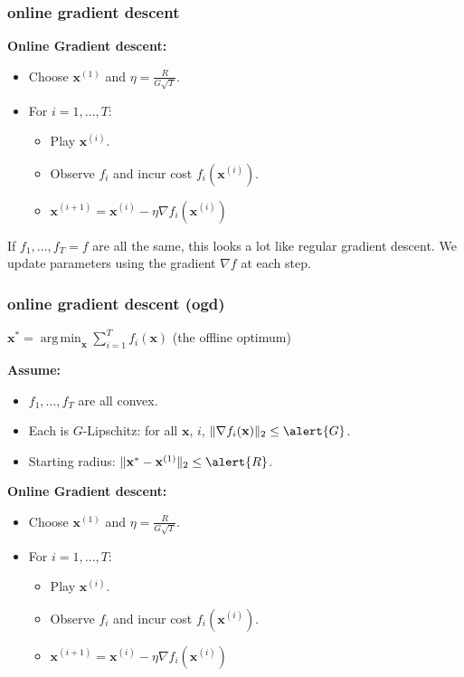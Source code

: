 \documentclass[compress]{beamer}
\newcommand{\bv}[1]{\mathbf{#1}}
\DeclareMathOperator*{\argmin}{arg\,min}
\begin{document}
\begin{frame}[t]
	\frametitle{online gradient descent}
	\textbf{Online Gradient descent:}
\begin{itemize}
	\item Choose $\bv{x}^{(1)}$ and $\eta = \frac{R}{G\sqrt{T}}$. 
	\item For $i = 1,\ldots, T$:
	\begin{itemize}
		\item Play $\bv{x}^{(i)}$.
		\item Observe $f_{i}$ and incur cost $f_{i}(\bv{x}^{(i)})$. 
		\item $\bv{x}^{(i+1)} = \bv{x}^{(i)} - \eta \nabla f_i(\bv{x}^{(i)})$
	\end{itemize}
\end{itemize}
If $f_1, \ldots, f_T = f$ are all the same, this looks a lot like regular gradient descent. We update parameters using the gradient $\nabla f$ at each step. 
\end{frame}

\begin{frame}[t]
	\frametitle{online gradient descent (ogd)}
	$\bv{x}^{*} = \argmin_\bv{x}\sum_{i=1}^T f_i(\bv{x})$ (the offline optimum)
	
	\textbf{Assume:}
	\begin{itemize}
		\item $f_1, \ldots, f_T$ are all convex.
		\item Each is $G$-Lipschitz: for all $\bv{x}$, $i$, $\|\nabla f_i(\bv{x})\|_2 \leq \alert{G}$.
		\item Starting radius: $\|\bv{x}^{*} - \bv{x}^{(1)}\|_2 \leq \alert{R}$.
	\end{itemize}
	
	\textbf{Online Gradient descent:}
	\begin{itemize}
	\item Choose $\bv{x}^{(1)}$ and $\eta = \frac{R}{G\sqrt{T}}$. 
	\item For $i = 1,\ldots, T$:
	\begin{itemize}
		\item Play $\bv{x}^{(i)}$.
		\item Observe $f_{i}$ and incur cost $f_{i}(\bv{x}^{(i)})$. 
		\item $\bv{x}^{(i+1)} = \bv{x}^{(i)} - \eta \nabla f_i(\bv{x}^{(i)})$
	\end{itemize}
\end{itemize}
\end{frame}
\end{document}
